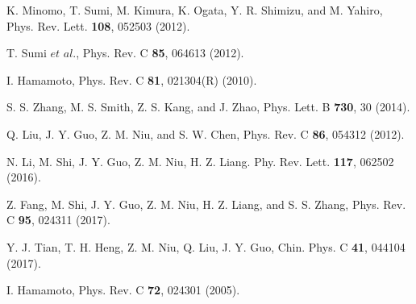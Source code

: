 \documentclass[twocolumn,prc,showpacs,preprintnumbers,superscriptaddress,floatfix]{revtex4}
\begin{document}
\begin{thebibliography}{99}
 K. Minomo, T. Sumi, M. Kimura, K. Ogata, Y. R. Shimizu,
and M. Yahiro, Phys. Rev. Lett. \textbf{108}, 052503 (2012).

 T. Sumi $et$ $al$., Phys. Rev. C \textbf{85}, 064613
(2012).

 I. Hamamoto, Phys. Rev. C \textbf{81}, 021304(R)
(2010).

 S. S. Zhang, M. S. Smith, Z. S. Kang, and J. Zhao, Phys.
Lett. B \textbf{730}, 30 (2014).

 Q. Liu, J. Y. Guo, Z. M. Niu, and S. W. Chen, Phys. Rev. C
\textbf{86}, 054312 (2012).

 N. Li, M. Shi, J. Y. Guo, Z. M. Niu, H. Z. Liang. Phy. Rev.
Lett. \textbf{117}, 062502 (2016).

 Z. Fang, M. Shi, J. Y. Guo, Z. M. Niu, H. Z. Liang, and
S. S. Zhang, Phys. Rev. C \textbf{95}, 024311 (2017).

 Y. J. Tian, T. H. Heng, Z. M. Niu, Q. Liu, J. Y. Guo,
Chin. Phys. C \textbf{41}, 044104 (2017).

 I. Hamamoto, Phys. Rev. C \textbf{72}, 024301 (2005).
\end{thebibliography}
\end{document}
